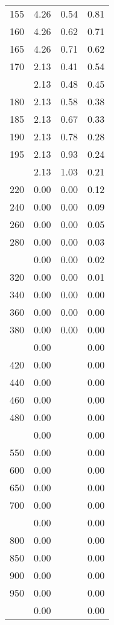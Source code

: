 \begin{table}[ht]
\begin{tabular}{lccc}
  155 & 4.26 & 0.54 & 0.81 \\ 
  160 & 4.26 & 0.62 & 0.71 \\ 
  165 & 4.26 & 0.71 & 0.62 \\ 
  170 & 2.13 & 0.41 & 0.54 \\ 
   \addlinespace
175 & 2.13 & 0.48 & 0.45 \\ 
  180 & 2.13 & 0.58 & 0.38 \\ 
  185 & 2.13 & 0.67 & 0.33 \\ 
  190 & 2.13 & 0.78 & 0.28 \\ 
  195 & 2.13 & 0.93 & 0.24 \\ 
   \addlinespace
200 & 2.13 & 1.03 & 0.21 \\ 
  220 & 0.00 & 0.00 & 0.12 \\ 
  240 & 0.00 & 0.00 & 0.09 \\ 
  260 & 0.00 & 0.00 & 0.05 \\ 
  280 & 0.00 & 0.00 & 0.03 \\ 
   \addlinespace
300 & 0.00 & 0.00 & 0.02 \\ 
  320 & 0.00 & 0.00 & 0.01 \\ 
  340 & 0.00 & 0.00 & 0.00 \\ 
  360 & 0.00 & 0.00 & 0.00 \\ 
  380 & 0.00 & 0.00 & 0.00 \\ 
   \addlinespace
400 & 0.00 &  & 0.00 \\ 
  420 & 0.00 &  & 0.00 \\ 
  440 & 0.00 &  & 0.00 \\ 
  460 & 0.00 &  & 0.00 \\ 
  480 & 0.00 &  & 0.00 \\ 
   \addlinespace
500 & 0.00 &  & 0.00 \\ 
  550 & 0.00 &  & 0.00 \\ 
  600 & 0.00 &  & 0.00 \\ 
  650 & 0.00 &  & 0.00 \\ 
  700 & 0.00 &  & 0.00 \\ 
   \addlinespace
750 & 0.00 &  & 0.00 \\ 
  800 & 0.00 &  & 0.00 \\ 
  850 & 0.00 &  & 0.00 \\ 
  900 & 0.00 &  & 0.00 \\ 
  950 & 0.00 &  & 0.00 \\ 
   \addlinespace
1000 & 0.00 &  & 0.00 \\ 
   \bottomrule
\end{tabular}
\end{table}

